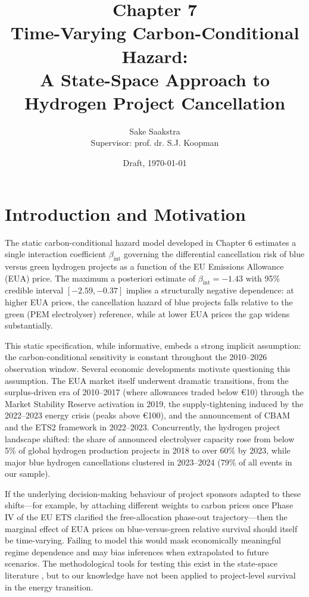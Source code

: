 \documentclass[11pt,a4paper]{article}
\title{\textbf{Chapter 7}\\[0.3em] Time-Varying Carbon-Conditional Hazard:\\
A State-Space Approach to Hydrogen Project Cancellation}
\author{Sake Saakstra \\ \small Supervisor: prof. dr. S.J. Koopman}
\date{Draft, \today}
\newcommand{\bint}{\beta_{\mathrm{int}}}
\begin{document}
\maketitle

\section{Introduction and Motivation}
\label{sec:ch7-intro}

The static carbon-conditional hazard model developed in Chapter 6 estimates a single interaction coefficient $\bint$ governing the differential cancellation risk of blue versus green hydrogen projects as a function of the EU Emissions Allowance (EUA) price. The maximum a posteriori estimate of $\bint = -1.43$ with 95\% credible interval $[-2.59, -0.37]$ implies a structurally negative dependence: at higher EUA prices, the cancellation hazard of blue projects falls relative to the green (PEM electrolyser) reference, while at lower EUA prices the gap widens substantially.

This static specification, while informative, embeds a strong implicit assumption: the carbon-conditional sensitivity is constant throughout the 2010--2026 observation window. Several economic developments motivate questioning this assumption. The EUA market itself underwent dramatic transitions, from the surplus-driven era of 2010--2017 (where allowances traded below \euro 10) through the Market Stability Reserve activation in 2019, the supply-tightening induced by the 2022--2023 energy crisis (peaks above \euro 100), and the announcement of CBAM and the ETS2 framework in 2022--2023. Concurrently, the hydrogen project landscape shifted: the share of announced electrolyser capacity rose from below 5\% of global hydrogen production projects in 2018 to over 60\% by 2023, while major blue hydrogen cancellations clustered in 2023--2024 (79\% of all events in our sample).

If the underlying decision-making behaviour of project sponsors adapted to these shifts---for example, by attaching different weights to carbon prices once Phase IV of the EU ETS clarified the free-allocation phase-out trajectory---then the marginal effect of EUA prices on blue-versus-green relative survival should itself be time-varying. Failing to model this would mask economically meaningful regime dependence and may bias inferences when extrapolated to future scenarios. The methodological tools for testing this exist in the state-space literature \citep{durbin2012time, koopman2000time}, but to our knowledge have not been applied to project-level survival in the energy transition.
\end{document}
